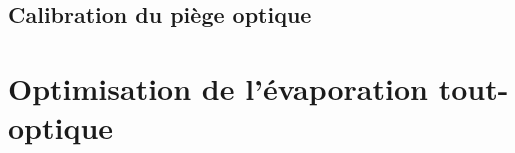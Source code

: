 \subsection{Calibration du piège optique}

\section{Optimisation de l'évaporation tout-optique}


\begin{comment}

%
%



\section{Models of confidence in perceptual decision-making}




\end{comment}
